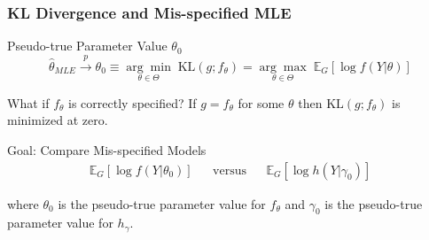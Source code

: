 \begin{frame}
  \frametitle{KL Divergence and Mis-specified MLE}

  \begin{block}{Pseudo-true Parameter Value $\theta_0$}
    \vspace{-1em}
  \[
    \widehat{\theta}_{MLE} \overset{p}{\rightarrow} \theta_0 \equiv \underset{\theta \in \Theta}{\arg \min} \; \text{KL}(g;f_\theta) = \underset{\theta \in \Theta}{\arg \max} \; \mathbb{E}_G[\log f(Y|\theta)] 
  \]
\end{block}


\pause

\begin{block}{What if $f_\theta$ is correctly specified?}
  If $g = f_\theta$ for some $\theta$ then $\text{KL}(g;f_\theta)$ is minimized at zero.
\end{block}

\pause

\begin{alertblock}{Goal: Compare Mis-specified Models}
  \vspace{-2.5em}
  \begin{align*}
    \mathbb{E}_G \left[ \log f(Y|\theta_0) \right] && \mbox{versus} && 
    \mathbb{E}_G \left[ \log h(Y|\gamma_0) \right]
  \end{align*}
  \vspace{-2em}

 where $\theta_0$ is the pseudo-true parameter value for $f_\theta$ and $\gamma_0$ is the pseudo-true parameter value for $h_\gamma$.
  
\end{alertblock}

\end{frame}
